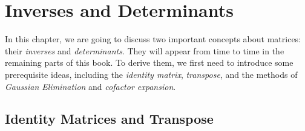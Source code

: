 \chapter{Inverses and Determinants}
\label{chapter:invdet}

In this chapter, we are going to discuss two important concepts about matrices: their \textit{inverses} and \textit{determinants}. They will appear from time to time in the remaining parts of this book. To derive them, we first need to introduce some prerequisite ideas, including the \textit{identity matrix}, \textit{transpose}, and the methods of \textit{Gaussian Elimination} and \textit{cofactor expansion}.

\section{Identity Matrices and Transpose}

